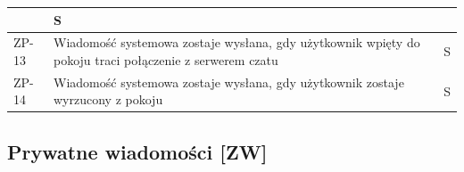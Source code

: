 \begin{tabular}{ | l | l | l | }
{    \strut} & \parbox[t]{1.8cm}{
      S

    } \\

   	\hline
    \parbox[t]{1.2cm}{
      ZP-13

    } & \parbox[t]{12.1cm}{\strut
      Wiadomość systemowa zostaje wysłana, gdy użytkownik
      wpięty do pokoju traci połączenie z serwerem czatu

    \strut} & \parbox[t]{1.8cm}{
      S

    } \\

   	\hline
    \parbox[t]{1.2cm}{
      ZP-14

    } & \parbox[t]{12.1cm}{\strut
      Wiadomość systemowa zostaje wysłana, gdy użytkownik
      zostaje wyrzucony z pokoju

    \strut} & \parbox[t]{1.8cm}{
      S

    } \\

    \hline

  \end{tabular}

\newpage

\subsection{Prywatne wiadomości [ZW]}

\leavevmode\hbox{}

